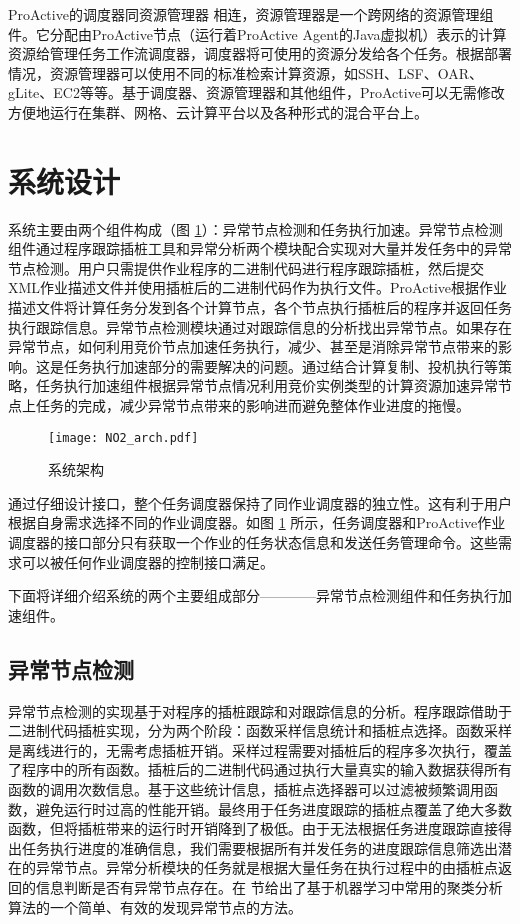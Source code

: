 ProActive的调度器同资源管理器 \cite{parm} 相连，资源管理器是一个跨网络的资源管理组件。它分配由ProActive节点（运行着ProActive Agent的Java虚拟机）表示的计算资源给管理任务工作流调度器，调度器将可使用的资源分发给各个任务。根据部署情况，资源管理器可以使用不同的标准检索计算资源，如SSH、LSF、OAR、gLite、EC2等等。基于调度器、资源管理器和其他组件，ProActive可以无需修改方便地运行在集群、网格、云计算平台以及各种形式的混合平台上。

\section{系统设计}
\label{sec:no2}
系统主要由两个组件构成（图 \ref{figure:no2arch}）：异常节点检测和任务执行加速。异常节点检测组件通过程序跟踪插桩工具和异常分析两个模块配合实现对大量并发任务中的异常节点检测。用户只需提供作业程序的二进制代码进行程序跟踪插桩，然后提交XML作业描述文件并使用插桩后的二进制代码作为执行文件。ProActive根据作业描述文件将计算任务分发到各个计算节点，各个节点执行插桩后的程序并返回任务执行跟踪信息。异常节点检测模块通过对跟踪信息的分析找出异常节点。如果存在异常节点，如何利用竞价节点加速任务执行，减少、甚至是消除异常节点带来的影响。这是任务执行加速部分的需要解决的问题。通过结合计算复制、投机执行等策略，任务执行加速组件根据异常节点情况利用竞价实例类型的计算资源加速异常节点上任务的完成，减少异常节点带来的影响进而避免整体作业进度的拖慢。
\begin{figure}
  \centering
  \texttt{[image: NO2\_arch.pdf]}
  \caption{系统架构}
  \label{figure:no2arch}
\end{figure}

通过仔细设计接口，整个任务调度器保持了同作业调度器的独立性。这有利于用户根据自身需求选择不同的作业调度器。如图 \ref{figure:no2arch} 所示，任务调度器和ProActive作业调度器的接口部分只有获取一个作业的任务状态信息和发送任务管理命令。这些需求可以被任何作业调度器的控制接口满足。

下面将详细介绍系统的两个主要组成部分————异常节点检测组件和任务执行加速组件。

\subsection{异常节点检测}
\label{subsec:no2_trace}
异常节点检测的实现基于对程序的插桩跟踪和对跟踪信息的分析。程序跟踪借助于二进制代码插桩实现，分为两个阶段：函数采样信息统计和插桩点选择。函数采样是离线进行的，无需考虑插桩开销。采样过程需要对插桩后的程序多次执行，覆盖了程序中的所有函数。插桩后的二进制代码通过执行大量真实的输入数据获得所有函数的调用次数信息。基于这些统计信息，插桩点选择器可以过滤被频繁调用函数，避免运行时过高的性能开销。最终用于任务进度跟踪的插桩点覆盖了绝大多数函数，但将插桩带来的运行时开销降到了极低。由于无法根据任务进度跟踪直接得出任务执行进度的准确信息，我们需要根据所有并发任务的进度跟踪信息筛选出潜在的异常节点。异常分析模块的任务就是根据大量任务在执行过程中的由插桩点返回的信息判断是否有异常节点存在。在 \label{subsec:no2_clustering} 节给出了基于机器学习中常用的聚类分析算法的一个简单、有效的发现异常节点的方法。

